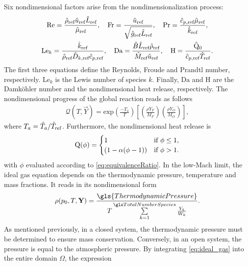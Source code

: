 Six nondimensional factors arise from the nondimensionalization process:
\begin{gather*}
	\text{Re} = \frac{\RefVal{\rho} \RefVal{u}  \RefVal{L}}{\RefVal{\Viscosity}}, \quad
	\text{Fr} = \frac{\RefVal{u}}{\sqrt{\RefVal{g}\RefVal{L}}}, \quad
	\text{Pr} = \frac{\RefValS{c}{p} \RefVal{\Viscosity}}{\RefVal{k}},\\%
	\text{Le}_k = \frac{\RefVal{k}}{\RefVal{\rho} \RefValS{D}{k} \RefValS{c}{p}}, \quad
	\Da = \frac{\hat B \RefVal{L} \RefVal{\rho}}{\RefVal{M}\RefVal{u}}, \quad \label{eq:Dahmkoeler}
	\text{H} = \frac{\hat \heatRelease_0}{\RefValS{c}{p} \RefVal{T}}.%
\end{gather*}
The first three equations define the Reynolds, Froude and Prandtl number, respectively. $\text{Le}_k$ is the Lewis number of species $k$. Finally, $\text{Da}$ and H are the Damköhler number and the nondimensional heat release, respectively. The nondimensional progress of the global reaction reads as follows
\begin{align}
	\mathcal{Q}(T, \vec{Y})  = \text{exp}\left(\frac{-T_a}{T}\right) \left[\left(\frac{\rho Y_F}{M_F}\right) \left(\frac{\rho Y_O}{M_O}\right)\right], \label{eq:NonDimArr}
\end{align}
where $T_a = \hat{T}_a / \hat T_{\text{ref}}$. Furthermore, the nondimensional heat release is
\begin{equation}
	\mathrm{Q}(\phi)=
	\begin{cases}
		1                     & \text{if}~ \phi \leq 1, \\
		(1 - \alpha(\phi -1)) & \text{if}~\phi > 1.
	\end{cases}  \label{eq:heatReleaseOneStepNonDim}
\end{equation}
with $\phi$ evaluated according to \cref{eq:equivalenceRatio}. In the low-Mach limit, the ideal gas equation depends on the thermodynamic pressure, temperature and mass fractions. It reads in its nondimensional form
\begin{align} \label{eq:ideal_gas}
	\rho(p_0,T, \vec{Y}) = \frac{\gls{ThermodynamicPressure}}{T \SumOvAllns \frac{Y_k}{W_k}}.
\end{align}
As mentioned previously, in a closed system, the thermodynamic pressure must be determined to ensure mass conservation. Conversely, in an open system, the pressure is equal to the atmospheric pressure. By integrating \cref{eq:ideal_gas} into the entire domain $\Omega$, the expression
